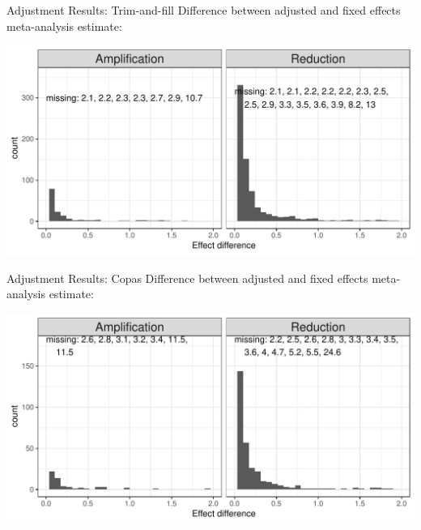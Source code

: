 \documentclass[english]{beamer}\usepackage[]{graphicx}\usepackage[]{color}
\makeatletter
\def\maxwidth{ %
  \ifdim\Gin@nat@width>\linewidth
    \linewidth
  \else
    \Gin@nat@width
  \fi
}
\newenvironment{knitrout}{}{} %
\makeatother
\begin{document}
\begin{frame}[fragile]{Adjustment Results: Trim-and-fill}
Difference between adjusted and fixed effects meta-analysis estimate:

\vspace{-3mm}
\begin{knitrout}
\color{fgcolor}
\includegraphics[width=\maxwidth]{figure/unnamed-chunk-12-1} 

\end{knitrout}
\end{frame}


\begin{frame}[fragile]{Adjustment Results: Copas}
Difference between adjusted and fixed effects meta-analysis estimate:

\vspace{-3mm}
\begin{knitrout}
\color{fgcolor}
\includegraphics[width=\maxwidth]{figure/unnamed-chunk-13-1} 

\end{knitrout}
\end{frame}
\end{document}
